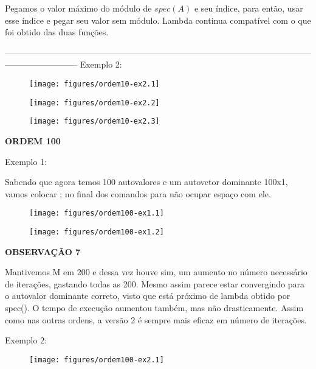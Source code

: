 \documentclass[leqno]{article}
\numberwithin{equation}{section}
\begin{document}
\begin{enumerate}
		Pegamos o valor máximo do módulo de $spec(A)$ e seu índice, para então, usar esse índice e pegar seu valor sem módulo.
		Lambda continua compatível com o que foi obtido das duas funções.
		
		--------------------------------------------------------------------------------------------------------------------------------------
		\newpage
		Exemplo 2:
		
		\begin{figure}[H]
			\centering
			\texttt{[image: figures/ordem10-ex2.1]}
		\end{figure}
		
		\begin{figure}[H]
			\centering
			\texttt{[image: figures/ordem10-ex2.2]}
		\end{figure}

		\begin{figure}[H]
			\centering
			\texttt{[image: figures/ordem10-ex2.3]}
		\end{figure}
		
		\newpage
		\textbf{{\large ORDEM 100}}
		
		Exemplo 1:
		
		Sabendo que agora temos 100 autovalores e um autovetor dominante 100x1, vamos colocar ; no final dos comandos para não ocupar espaço com ele. 
		
		\begin{figure}[H]
			\centering
			\texttt{[image: figures/ordem100-ex1.1]}
		\end{figure}
		
		\begin{figure}[H]
			\centering
			\texttt{[image: figures/ordem100-ex1.2]}
		\end{figure}
		
		\textbf{{\normalsize OBSERVAÇÃO 7}}
		
		Mantivemos M em 200 e dessa vez houve sim, um aumento no número necessário de iterações, gastando todas as 200. Mesmo assim parece estar convergindo para o autovalor dominante correto, visto que está próximo de lambda obtido por spec().		
		O tempo de execução aumentou também, mas não drasticamente. Assim como nas outras ordens, a versão 2 é sempre mais eficaz em número de iterações.
		
		\newpage
		Exemplo 2:
		
		\begin{figure}[H]
			\centering
			\texttt{[image: figures/ordem100-ex2.1]}
		\end{figure}
		

\end{enumerate}
\end{document}
